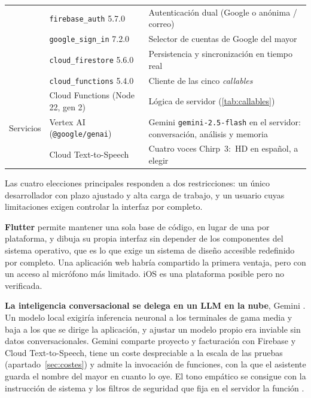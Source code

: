 \begin{table}[htbp]
\begin{tabularx}{\textwidth}{@{}l l >{\RaggedRight\arraybackslash}X@{}}
                    & \texttt{firebase\_auth} 5.7.0  & Autenticación dual (Google o anónima / correo) \\
                    & \texttt{google\_sign\_in} 7.2.0 & Selector de cuentas de Google del mayor \\
                    & \texttt{cloud\_firestore} 5.6.0 & Persistencia y sincronización en tiempo real \\
                    & \texttt{cloud\_functions} 5.4.0 & Cliente de las cinco \emph{callables} \\
                    & Cloud Functions (Node 22, gen 2) & Lógica de servidor (\autoref{tab:callables}) \\
        \midrule
        Servicios   & Vertex AI (\texttt{@google/genai}) & Gemini \texttt{gemini-2.5-flash} en el servidor: conversación, análisis y memoria \\
                    & Cloud Text-to-Speech           & Cuatro voces Chirp~3:~HD en español, a elegir \\
        \bottomrule
    \end{tabularx}

\end{table}

Las cuatro elecciones principales responden a dos restricciones: un único desarrollador con plazo ajustado y alta carga de trabajo, y un usuario cuyas limitaciones exigen controlar la interfaz por completo.

\textbf{Flutter} permite mantener una sola base de código, en lugar de una por plataforma, y dibuja su propia interfaz sin depender de los componentes del sistema operativo, que es lo que exige un sistema de diseño accesible redefinido por completo. Una aplicación web habría compartido la primera ventaja, pero con un acceso al micrófono más limitado. iOS es una plataforma posible pero no verificada.

\textbf{La inteligencia conversacional se delega en un LLM en la nube}, Gemini . Un modelo local exigiría inferencia neuronal a los terminales de gama media y baja a los que se dirige la aplicación, y ajustar un modelo propio era inviable sin datos conversacionales. Gemini comparte proyecto y facturación con Firebase y Cloud Text-to-Speech, tiene un coste despreciable a la escala de las pruebas (apartado~\ref{sec:costes}) y admite la invocación de funciones, con la que el asistente guarda el nombre del mayor en cuanto lo oye. El tono empático se consigue con la instrucción de sistema y los filtros de seguridad que fija en el servidor la función .

